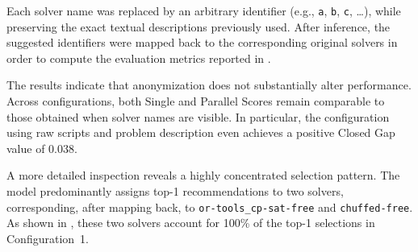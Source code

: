\documentclass[../../main]{subfiles}
\begin{document}
Each solver name was replaced by an arbitrary identifier (e.g., \texttt{a}, \texttt{b}, \texttt{c}, \dots), while preserving the exact textual descriptions previously used. After inference, the suggested identifiers were mapped back to the corresponding original solvers in order to compute the evaluation metrics reported in .

\begin{table}[ht]
    \centering
    \caption{Analysis over configurations involving anonymous solvers, evaluated with \texttt{gpt-oss-120b}. Columns are computed as in , after mapping each suggestion back to the solver from which the description was taken.}
    \label{tab:CombinedAnonymous}
\end{table}

The results indicate that anonymization does not substantially alter performance. Across configurations, both Single and Parallel Scores remain comparable to those obtained when solver names are visible. In particular, the configuration using raw scripts and problem description even achieves a positive Closed Gap value of 0.038.

A more detailed inspection reveals a highly concentrated selection pattern. The model predominantly assigns top-1 recommendations to two solvers, corresponding, after mapping back, to \texttt{or-tools\_cp-sat-free} and \texttt{chuffed-free}. As shown in , these two solvers account for 100\% of the top-1 selections in Configuration~1.
\end{document}
